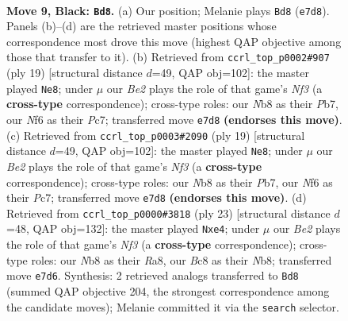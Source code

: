 \documentclass[11pt]{article}
\begin{document}
\clearpage

\begin{figure}[p]\centering
\begin{subfigure}{0.46\textwidth}\centering
\resizebox{\linewidth}{!}{%
\newchessgame
\chessboard[
  setfen={rnb2rk1/ppq1bppp/4pn2/2Pp4/3P4/2N2N2/PP2BPPP/R1BQ1RK1 b - - 4 9},
  showmover=false,
  pgfstyle=straightmove, color=movearrow, markmove={e7-d8}
]}
\caption{}
\end{subfigure}\hfill
\begin{subfigure}{0.46\textwidth}\centering
\resizebox{\linewidth}{!}{%
\newchessgame
\chessboard[
  setfen={r1bq1rk1/1pp2pbp/n4np1/p2Pp3/2P1P3/2NB1N2/PP4PP/R1BQ1RK1 b - - 3 10},
  showmover=false,
  pgfstyle=straightmove, color=movearrow, markmove={f6-e8}
]}
\caption{}
\end{subfigure}
\\[4pt]
\begin{subfigure}{0.46\textwidth}\centering
\resizebox{\linewidth}{!}{%
\newchessgame
\chessboard[
  setfen={r1bq1rk1/1pp2pbp/n4np1/p2Pp3/2P1P3/2NB1N2/PP4PP/R1BQ1RK1 b - - 3 10},
  showmover=false,
  pgfstyle=straightmove, color=movearrow, markmove={f6-e8}
]}
\caption{}
\end{subfigure}\hfill
\begin{subfigure}{0.46\textwidth}\centering
\resizebox{\linewidth}{!}{%
\newchessgame
\chessboard[
  setfen={rn3rk1/1bq1ppbp/p4np1/1pP5/4P3/2N1BN2/PP2BPPP/R2Q1RK1 b - - 2 12},
  showmover=false,
  pgfstyle=straightmove, color=movearrow, markmove={f6-e4}
]}
\caption{}
\end{subfigure}
\caption{\textbf{Move 9, Black: \texttt{Bd8}.} (a) Our position; Melanie plays \texttt{Bd8} (\texttt{e7d8}). Panels (b)--(d) are the retrieved master positions whose correspondence most drove this move (highest QAP objective among those that transfer to it). (b) Retrieved from \texttt{ccrl\_top\_p0002\#907} (ply 19) [structural distance $d$=49, QAP obj=102]: the master played \texttt{Ne8}; under $\mu$ our \emph{Be2} plays the role of that game's \emph{Nf3} (a \textbf{cross-type} correspondence); cross-type roles: our \emph{N}b8 as their \emph{P}b7, our \emph{N}f6 as their \emph{P}c7; transferred move \texttt{e7d8} \textbf{(endorses this move)}. (c) Retrieved from \texttt{ccrl\_top\_p0003\#2090} (ply 19) [structural distance $d$=49, QAP obj=102]: the master played \texttt{Ne8}; under $\mu$ our \emph{Be2} plays the role of that game's \emph{Nf3} (a \textbf{cross-type} correspondence); cross-type roles: our \emph{N}b8 as their \emph{P}b7, our \emph{N}f6 as their \emph{P}c7; transferred move \texttt{e7d8} \textbf{(endorses this move)}. (d) Retrieved from \texttt{ccrl\_top\_p0000\#3818} (ply 23) [structural distance $d$=48, QAP obj=132]: the master played \texttt{Nxe4}; under $\mu$ our \emph{Be2} plays the role of that game's \emph{Nf3} (a \textbf{cross-type} correspondence); cross-type roles: our \emph{N}b8 as their \emph{R}a8, our \emph{B}c8 as their \emph{N}b8; transferred move \texttt{e7d6}. Synthesis: 2 retrieved analogs transferred to \texttt{Bd8} (summed QAP objective 204, the strongest correspondence among the candidate moves); Melanie committed it via the \texttt{search} selector.}
\label{fig:thought-m17}
\end{figure}
\end{document}
